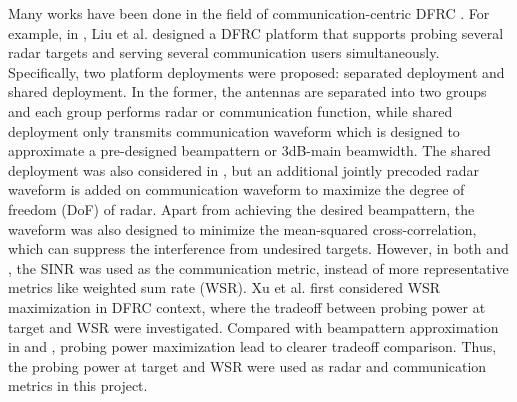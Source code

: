 Many works have been done in the field of communication-centric DFRC \cite{liu2018beamforming,liu2020beamforming,xu2020tradeoff}. 
For example, in \cite{liu2018beamforming}, Liu et al. designed a DFRC platform that supports probing several radar targets and serving several communication 
users simultaneously. Specifically, two platform deployments were proposed: separated deployment and shared deployment. In the former, 
the antennas are separated into two groups and each group performs radar or communication function, while shared 
deployment only transmits communication waveform which is designed to approximate a pre-designed beampattern or 3dB-main beamwidth. 
The shared deployment was also considered in \cite{liu2020beamforming}, but an additional jointly precoded
radar waveform is added on communication waveform to maximize the degree of freedom (DoF) of radar. Apart from achieving the desired beampattern, the waveform was also 
designed to minimize the mean-squared cross-correlation, which can suppress the interference from undesired targets. However, in 
both \cite{liu2018beamforming} and \cite{liu2020beamforming}, the SINR was used as the communication metric, instead of more representative 
metrics like weighted sum rate (WSR). Xu et al. \cite{xu2020tradeoff} first considered WSR maximization in DFRC context, where the 
tradeoff between probing power at target and WSR were investigated. Compared with beampattern approximation in \cite{liu2018beamforming} and \cite{liu2020beamforming},
probing power maximization lead to clearer tradeoff comparison. Thus,
the probing power at target and WSR were used as radar and communication metrics in this project.


